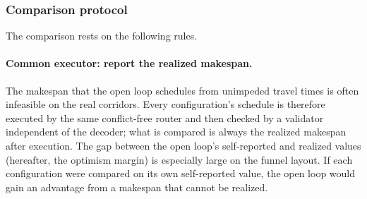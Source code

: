 \begin{table}[t]
\caption{Controlled instances. All instances share $12$ jobs, $36$ real operations, $8$ robotic arms, $H=0.3$, and
$\bar{T}_t/\bar{T}_p\approx4.0$; the three families vary only the layout, the vehicle-to-arm ratio, and flexibility, respectively. Contention intensity is the share of yielding wait in total travel time on the initial
random population; it is determined by the instance structure and is not an input parameter.}
\label{tab:instances}
\small

\end{table}

\subsubsection{Comparison protocol}
\label{sec:protocol}

The comparison rests on the following rules.

\paragraph{Common executor: report the realized makespan.}
The makespan that the open loop schedules from unimpeded travel times is often infeasible on the real corridors.
Every configuration's schedule is therefore executed by the same conflict-free router and then checked by a validator independent of the decoder; what is compared is always the realized makespan after execution.
The gap between the open loop's self-reported and realized values (hereafter, the optimism margin) is especially large on the funnel layout.
If each configuration were compared on its own self-reported value, the open loop would gain an advantage from a makespan that cannot be realized.

